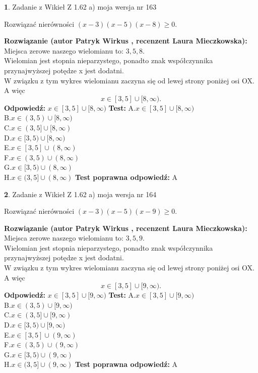 \documentclass[12pt, a4paper]{article}
\theoremstyle{definition} %
\newtheorem{zad}{}
\newcommand{\zadStart}[1]{\begin{zad}#1\newline}
\newcommand{\zadStop}{\end{zad}}
\newcommand{\rozwStart}[2]{\noindent \textbf{Rozwiązanie (autor #1 , recenzent #2): }\newline}
\newcommand{\rozwStop}{\newline}
\newcommand{\odpStart}{\noindent \textbf{Odpowiedź:}\newline}
\newcommand{\odpStop}{\newline}
\newcommand{\testStart}{\noindent \textbf{Test:}\newline}
\newcommand{\testStop}{\newline}
\newcommand{\kluczStart}{\noindent \textbf{Test poprawna odpowiedź:}\newline}
\newcommand{\kluczStop}{\newline}
\begin{document}
\zadStart{Zadanie z Wikieł Z 1.62 a) moja wersja nr 163}

Rozwiązać nierówności $(x-3)(x-5)(x-8)\ge0$.
\zadStop
\rozwStart{Patryk Wirkus}{Laura Mieczkowska}
Miejsca zerowe naszego wielomianu to: $3, 5, 8$.\\
Wielomian jest stopnia nieparzystego, ponadto znak współczynnika przy\linebreak najwyższej potędze x jest dodatni.\\ W związku z tym wykres wielomianu zaczyna się od lewej strony poniżej osi OX. A więc $$x \in [3,5] \cup [8,\infty).$$
\rozwStop
\odpStart
$x \in [3,5] \cup [8,\infty)$
\odpStop
\testStart
A.$x \in [3,5] \cup [8,\infty)$\\
B.$x \in (3,5) \cup [8,\infty)$\\
C.$x \in (3,5] \cup [8,\infty)$\\
D.$x \in [3,5) \cup [8,\infty)$\\
E.$x \in [3,5] \cup (8,\infty)$\\
F.$x \in (3,5) \cup (8,\infty)$\\
G.$x \in [3,5) \cup (8,\infty)$\\
H.$x \in (3,5] \cup (8,\infty)$
\testStop
\kluczStart
A
\kluczStop



\zadStart{Zadanie z Wikieł Z 1.62 a) moja wersja nr 164}

Rozwiązać nierówności $(x-3)(x-5)(x-9)\ge0$.
\zadStop
\rozwStart{Patryk Wirkus}{Laura Mieczkowska}
Miejsca zerowe naszego wielomianu to: $3, 5, 9$.\\
Wielomian jest stopnia nieparzystego, ponadto znak współczynnika przy\linebreak najwyższej potędze x jest dodatni.\\ W związku z tym wykres wielomianu zaczyna się od lewej strony poniżej osi OX. A więc $$x \in [3,5] \cup [9,\infty).$$
\rozwStop
\odpStart
$x \in [3,5] \cup [9,\infty)$
\odpStop
\testStart
A.$x \in [3,5] \cup [9,\infty)$\\
B.$x \in (3,5) \cup [9,\infty)$\\
C.$x \in (3,5] \cup [9,\infty)$\\
D.$x \in [3,5) \cup [9,\infty)$\\
E.$x \in [3,5] \cup (9,\infty)$\\
F.$x \in (3,5) \cup (9,\infty)$\\
G.$x \in [3,5) \cup (9,\infty)$\\
H.$x \in (3,5] \cup (9,\infty)$
\testStop
\kluczStart
A
\kluczStop
\end{document}
